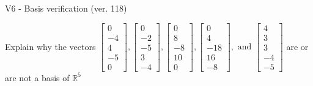 \begin{exercise}
  \begin{exerciseTitle}V6 - Basis verification (ver. 118)\end{exerciseTitle}
  \begin{exerciseStatement}
    Explain why the vectors \(\left[\begin{array}{r}
0 \\
-4 \\
4 \\
-5 \\
0
\end{array}\right] , \left[\begin{array}{r}
0 \\
-2 \\
-5 \\
3 \\
-4
\end{array}\right] , \left[\begin{array}{r}
0 \\
8 \\
-8 \\
10 \\
0
\end{array}\right] , \left[\begin{array}{r}
0 \\
4 \\
-18 \\
16 \\
-8
\end{array}\right] , \text{ and } \left[\begin{array}{r}
4 \\
3 \\
3 \\
-4 \\
-5
\end{array}\right]\) are or are not a basis of \(\mathbb{R}^5\)	



\end{exerciseStatement}
\end{exercise}

